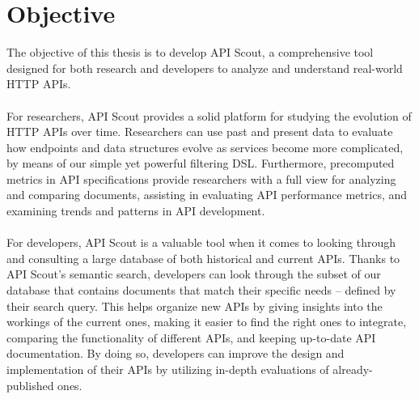\section{Objective}\label{sec:objective}
The objective of this thesis is to develop API Scout, a comprehensive tool designed for both research and developers to analyze and understand real-world HTTP APIs. \\ \\
For researchers, API Scout provides a solid platform for studying the evolution of HTTP APIs over time.
Researchers can use past and present data to evaluate how endpoints and data structures evolve as services become more complicated, by means of our simple yet powerful filtering DSL\@.
Furthermore, precomputed metrics in API specifications provide researchers with a full view for analyzing and comparing documents, assisting in evaluating API performance metrics, and examining trends and patterns in API development. \\ \\
For developers, API Scout is a valuable tool when it comes to looking through and consulting a large database of both historical and current APIs.
Thanks to API Scout's semantic search, developers can look through the subset of our database that contains documents that match their specific needs -- defined by their search query.
This helps organize new APIs by giving insights into the workings of the current ones, making it easier to find the right ones to integrate, comparing the functionality of different APIs, and keeping up-to-date API documentation.
By doing so, developers can improve the design and implementation of their APIs by utilizing in-depth evaluations of already-published ones.
